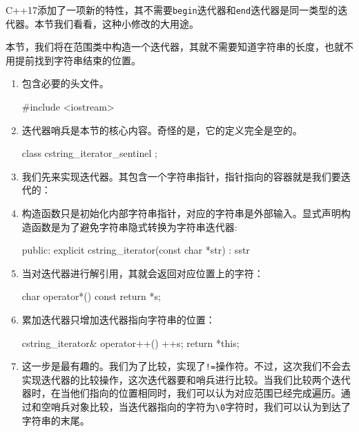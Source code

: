 C++17添加了一项新的特性，其不需要\texttt{begin}迭代器和\texttt{end}迭代器是同一类型的迭代器。本节我们看看，这种小修改的大用途。


本节，我们将在范围类中构造一个迭代器，其就不需要知道字符串的长度，也就不用提前找到字符串结束的位置。

\begin{enumerate}
\item 包含必要的头文件。

\begin{codebox}[cpp]
#include <iostream> 
\end{codebox}

\item 迭代器哨兵是本节的核心内容。奇怪的是，它的定义完全是空的。

\begin{codebox}[cpp]
class cstring_iterator_sentinel {};
\end{codebox}

\item 我们先来实现迭代器。其包含一个字符串指针，指针指向的容器就是我们要迭代的：

\begin{codebox}[cpp]
class cstring_iterator {
    const char *s {nullptr};
\end{codebox}

\item 构造函数只是初始化内部字符串指针，对应的字符串是外部输入。显式声明构造函数是为了避免字符串隐式转换为字符串迭代器:

\begin{codebox}[cpp]
public:
    explicit cstring_iterator(const char *str)
        : s{str}
    {}
\end{codebox}

\item 当对迭代器进行解引用，其就会返回对应位置上的字符：

\begin{codebox}[cpp]
    char operator*() const { return *s; }
\end{codebox}

\item 累加迭代器只增加迭代器指向字符串的位置：

\begin{codebox}[cpp]
cstring_iterator& operator++() {
    ++s;
    return *this;
}
\end{codebox}

\item 这一步是最有趣的。我们为了比较，实现了\texttt{!=}操作符。不过，这次我们不会去实现迭代器的比较操作，这次迭代器要和哨兵进行比较。当我们比较两个迭代器时，在当他们指向的位置相同时，我们可以认为对应范围已经完成遍历。通过和空哨兵对象比较，当迭代器指向的字符为\texttt{\textbackslash{}0}字符时，我们可以认为到达了字符串的末尾。


\end{enumerate}

